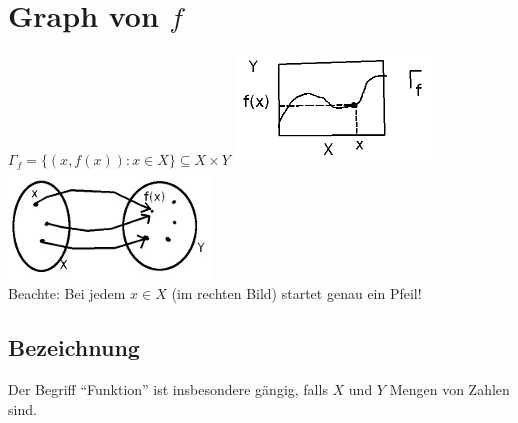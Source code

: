 {}
\section*{\texorpdfstring{Graph von $f$}{Graph von f}}
$\Gamma_f=\{(x,f(x)): x \in X\} \subseteq X \times Y$ \nl
\includegraphics[scale=0.5]{img/2013-10-28/1}
\includegraphics[scale=0.5]{img/2013-10-28/2}\\
Beachte: Bei jedem $x \in X$ (im rechten Bild) startet genau ein Pfeil!

\subsection*{Bezeichnung}
Der Begriff ``Funktion'' ist insbesondere gängig, falls $X$ und $Y$ Mengen von Zahlen sind.